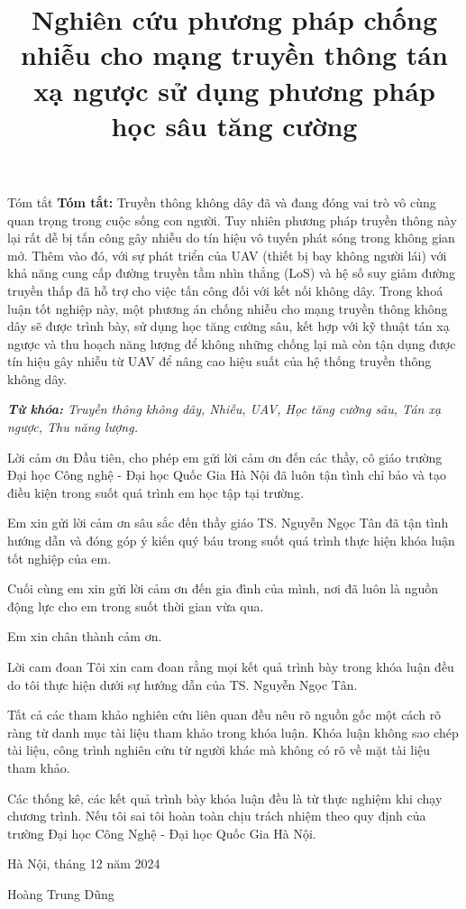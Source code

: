\documentclass{uetgraduation}
\begin{document}
\title{Nghiên cứu phương pháp chống nhiễu cho mạng truyền thông tán xạ ngược sử dụng phương pháp học sâu tăng cường}
\makecovers
\begin{preamble}{Tóm tắt}
\textbf{Tóm tắt:} Truyền thông không dây đã và đang đóng vai trò vô cùng quan trọng trong cuộc sống con người. Tuy
nhiên phương pháp truyền thông này lại rất dễ bị tấn công gây nhiễu do tín hiệu vô tuyến phát sóng trong không gian mở.
Thêm vào đó, với sự phát triển của UAV (thiết bị bay không người lái) với khả năng cung cấp đường truyền tầm nhìn thẳng
(LoS) và hệ số suy giảm đường truyền thấp đã hỗ trợ cho việc tấn công đối với kết nối không dây. Trong khoá luận tốt nghiệp
này, một phương án chống nhiễu cho mạng truyền thông không dây sẽ được trình bày, sử dụng học tăng cường sâu, kết hợp với
kỹ thuật tán xạ ngược và thu hoạch năng lượng để không những chống lại mà còn tận dụng được tín hiệu gây nhiễu từ UAV 
để nâng cao hiệu suất của hệ thống truyền thông không dây.

\textit{\textbf{Từ khóa:} Truyền thông không dây, Nhiễu, UAV, Học tăng cường sâu, Tán xạ ngược, Thu năng lượng.}
\end{preamble}
\begin{preamble}{Lời cảm ơn}
    Đầu tiên, cho phép em gửi lời cảm ơn đến các thầy, cô giáo trường Đại học Công nghệ - Đại học
    Quốc Gia Hà Nội đã luôn tận tình chỉ bảo và tạo điều kiện trong suốt quá trình em học
    tập tại trường.
    
    Em xin gửi lời cảm ơn sâu sắc đến thầy giáo TS. Nguyễn Ngọc Tân đã tận tình
    hướng dẫn và đóng góp ý kiến quý báu trong suốt quá trình thực hiện khóa luận tốt
    nghiệp của em.
    
    Cuối cùng em xin gửi lời cảm ơn đến gia đình của mình, nơi đã luôn là nguồn động lực cho em
    trong suốt thời gian vừa qua.
    
    Em xin chân thành cảm ơn.
\end{preamble}
\begin{preamble}{Lời cam đoan}
Tôi xin cam đoan rằng mọi kết quả trình bày trong khóa luận đều do tôi thực hiện
dưới sự hướng dẫn của TS. Nguyễn Ngọc Tân.

Tất cả các tham khảo nghiên cứu liên quan đều nêu rõ nguồn gốc một cách rõ ràng từ 
danh mục tài liệu tham khảo trong khóa luận. Khóa luận không sao chép tài liệu, 
công trình nghiên cứu từ người khác mà không có rõ về mặt tài liệu tham khảo.

Các thống kê, các kết quả trình bày khóa luận đều là từ thực nghiệm khi chạy chương trình. Nếu tôi sai 
tôi hoàn toàn chịu trách nhiệm theo quy định của trường Đại học Công Nghệ - Đại học Quốc Gia Hà Nội.

\begin{flushright}
    Hà Nội, tháng 12 năm 2024

    \vspace{45pt}
    Hoàng Trung Dũng
\end{flushright}
\end{preamble}
\end{document}
